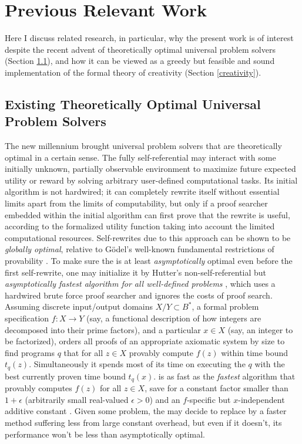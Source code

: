 \documentclass{article}
\begin{document}
\section{Previous Relevant Work}
\label{previous}

Here I discuss related research, in particular, why the present work is of interest despite
the recent advent of theoretically optimal universal problem solvers (Section \ref{optimal}),
and how it can be viewed as a greedy but feasible and sound implementation
of the formal theory of creativity (Section \ref{creativity}).


\subsection{Existing Theoretically Optimal Universal Problem Solvers}
\label{optimal}

The new millennium brought universal problem solvers
that are theoretically optimal in a certain sense.
The fully self-referential \cite{Goedel:31}
{\em \gm } \cite{Schmidhuber:05gmai,Schmidhuber:09gm}  may
interact with some initially unknown, partially observable environment
to maximize future expected utility or reward by solving arbitrary
user-defined computational tasks.
Its initial algorithm is not hardwired;
it can completely rewrite itself without essential limits
apart from the limits of computability,
but only if a proof searcher embedded within the initial algorithm 
can first prove that the rewrite is useful, 
according to the formalized utility function taking into account the
limited computational resources.
Self-rewrites due to this approach can be shown to be
{\em globally optimal}, relative to G\"{o}del's 
well-known fundamental restrictions of provability \cite{Goedel:31}.
To make sure the \gm is at least {\em asymptotically} optimal even before the first self-rewrite,
one may initialize it by
Hutter's non-self-referential but 
{\em asymptotically fastest algorithm for all well-defined problems}
\hs  \cite{Hutter:01fast+}, which 
uses a hardwired brute force proof searcher  and
ignores the costs of proof search.
Assuming discrete input/output domains $X/Y \subset B^*$, a formal problem
specification $f: X \rightarrow Y$
(say, a functional description of how integers are decomposed
into their prime factors),
and a particular $x \in X$ (say,
an integer to be factorized), \hs
orders all proofs of an appropriate axiomatic system
by size to find programs $q$ that
for all $z \in X$ provably compute $f(z)$
within time bound $t_q(z)$. Simultaneously it
spends most of its time on executing the $q$ with the
best currently proven time bound $t_q(x)$.
 \hs is as fast as the {\em fastest} algorithm that provably
computes $f(z)$ for all $z \in X$, save for a constant factor
smaller than $1 + \epsilon$ (arbitrarily small real-valued $\epsilon > 0$)
and an $f$-specific but $x$-independent
additive constant  \cite{Hutter:01fast+}.
Given some problem, the \gm may decide to replace \hs by a faster method  suffering less from 
large constant overhead,
but even if it doesn't, its performance won't be less than asymptotically optimal.
\end{document}
